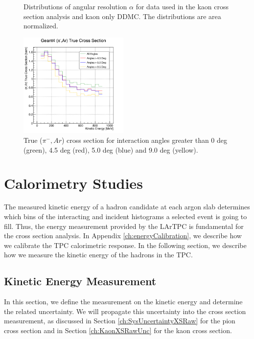 \begin{figure}[ht]
\begin{minipage}[t]{0.45\linewidth}
\caption[]{Distributions of angular resolution $\alpha$ for data used in the kaon cross section analysis and kaon only DDMC. The distributions are area normalized. } \label{fig:trackingResolutionK}
\end{minipage}
\end{figure}





\begin{figure}[p]
\centering
\includegraphics[width=0.48\textwidth]{Chapter-5/Images/cTrueXSAngle.png}
\caption{ True ($\pi^-, Ar$) cross section for interaction angles greater than 0 deg (green), 4.5 deg (red), 5.0 deg  (blue) and 9.0 deg (yellow). }
\label{fig:trueWithAngles}
\end{figure}



\clearpage

\section{Calorimetry Studies}\label{ch:energyCal} 
The measured kinetic energy of a hadron candidate at each argon slab determines which bins of the interacting and incident histograms a selected event is going to fill.  Thus, the energy measurement provided by the LArTPC is fundamental for the cross section analysis. In Appendix  \ref{ch:energyCalibration}, we describe how we calibrate the TPC calorimetric response. In the following section, we describe how we measure the kinetic energy of the hadrons in the TPC.




\subsection{Kinetic Energy Measurement}\label{ch:kinEn}
In this section, we define the measurement on the kinetic energy and  determine the related uncertainty. We will propagate this uncertainty into the cross section measurement, as discussed in Section \ref{ch:SysUncertaintyXSRaw} for the pion cross section and in Section \ref{ch:KaonXSRawUnc} for the kaon cross section.

